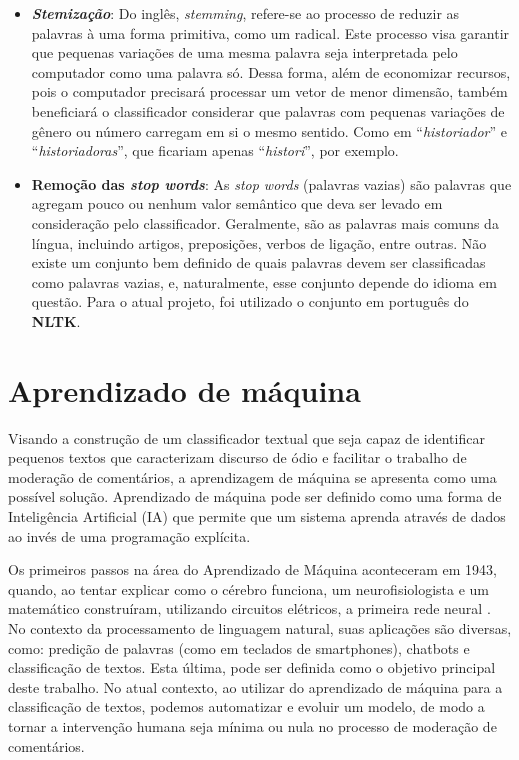 \begin{itemize}
\item \textbf{\textit{Stemização}}: Do inglês, \textit{stemming}, refere-se ao processo de reduzir as palavras à uma forma primitiva, como um radical. Este processo visa garantir que pequenas variações de uma mesma palavra seja interpretada pelo computador como uma palavra só. Dessa forma, além de economizar recursos, pois o computador precisará processar um vetor de menor dimensão, também beneficiará o classificador considerar que palavras com pequenas variações de gênero ou número carregam em si o mesmo sentido. Como em “\textit{historiador}” e “\textit{historiadoras}”, que ficariam apenas “\textit{histori}”, por exemplo.

\item \textbf{Remoção das \textit{stop words}}: As \textit{stop words} (palavras vazias) são palavras que agregam pouco ou nenhum valor semântico que deva ser levado em consideração pelo classificador. Geralmente, são as palavras mais comuns da língua, incluindo artigos, preposições, verbos de ligação, entre outras. Não existe um conjunto bem definido de quais palavras devem ser classificadas como palavras vazias, e, naturalmente, esse conjunto depende do idioma em questão. Para o atual projeto, foi utilizado o conjunto em português do \textbf{NLTK}.
\end{itemize}

\section{Aprendizado de máquina}

Visando a construção de um classificador textual que seja capaz de identificar pequenos textos que caracterizam discurso de ódio e facilitar o trabalho de moderação de comentários, a aprendizagem de máquina se apresenta como uma possível solução. Aprendizado de máquina pode ser definido como uma forma de Inteligência Artificial (IA) que permite que um sistema aprenda através de dados ao invés de uma programação explícita. \cite{mlfordummyes:2018}

Os primeiros passos na área do Aprendizado de Máquina aconteceram em 1943, quando, ao tentar explicar como o cérebro funciona, um neurofisiologista e um matemático construíram, utilizando circuitos elétricos, a primeira rede neural \cite{nnhistory}. No contexto da processamento de linguagem natural, suas aplicações são diversas, como: predição de palavras (como em teclados de smartphones), chatbots e classificação de textos. Esta última, pode ser definida como o objetivo principal deste trabalho.
No atual contexto, ao utilizar do aprendizado de máquina para a classificação de textos, podemos automatizar e evoluir um modelo, de modo a tornar a intervenção humana seja mínima ou nula no processo de moderação de comentários.

